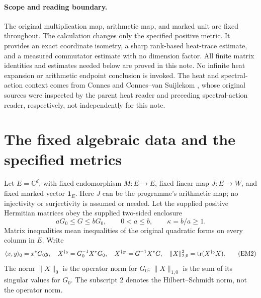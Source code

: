 \paragraph{Scope and reading boundary.}
The original multiplication map, arithmetic map, and marked unit are fixed
throughout. The calculation changes only the specified positive metric.
It provides an exact coordinate isometry, a sharp rank-based heat-trace
estimate, and a measured commutator estimate with no dimension factor.
All finite matrix identities and estimates needed below are proved in this
note. No infinite heat expansion or arithmetic endpoint conclusion is
invoked. The heat and spectral-action context comes from Connes
\cite{hem:ConnesHeat} and Connes--van Suijlekom \cite{hem:ConnesSuijlekom}, whose
original sources were inspected by the parent heat reader and preceding
spectral-action reader, respectively, not independently for this note.

\section{The fixed algebraic data and the specified metrics}

Let \(E=\mathbb C^d\), with fixed endomorphism \(M:E\to E\), fixed linear
map \(J:E\to W\), and fixed marked vector \(\mathbf1_E\).
Here \(J\) can be the programme's arithmetic map; no injectivity or
surjectivity is assumed or needed. Let the supplied positive Hermitian
matrices obey the supplied two-sided enclosure
\begin{equation}
 aG_0\le G\le bG_0,\qquad 0<a\le b,\qquad \kappa=b/a\ge1.
 \tag{EM1}\label{hem:EM1}
\end{equation}
Matrix inequalities mean inequalities of the original quadratic forms
on every column in \(E\). Write
\begin{equation}
 \langle x,y\rangle_0=x^*G_0y,\quad
 X^{\dagger_0}=G_0^{-1}X^*G_0,\quad
 X^{\dagger_G}=G^{-1}X^*G,\quad
 \|X\|_{2,0}^2=\operatorname{tr}(X^{\dagger_0}X).
 \tag{EM2}\label{hem:EM2}
\end{equation}
The norm \(\|X\|_0\) is the operator norm for \(G_0\);
\(\|X\|_{1,0}\) is the sum of its singular values for \(G_0\).
The subscript \(2\) denotes the Hilbert--Schmidt norm, not the operator norm.

